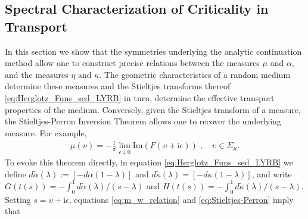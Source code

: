 \documentclass[english,12pt,jmp,graphicx]{revtex4-1}
\newcommand{\I}{\mathrm{i}}
\begin{document}
\subsection{Spectral Characterization of Criticality in
  Transport} \label{sec:Measure_Equivalences}   
%
In this section we show that the symmetries underlying the
analytic continuation method allow one to construct precise relations
between the measures $\mu$ and $\alpha$, and the measures $\eta$ and $\kappa$. The geometric
characteristics of a random medium determine these measures and the
Stieltjes transforms thereof \eqref{eq:Herglotz_Funs_sed_LYRB} in turn,
determine the effective transport properties of the
medium. Conversely, given the Stieltjes transform of a measure, the
Stieltjes-Perron Inversion Theorem
\cite{Day:JPCM-96,Henrici:1974:v3,MILTON:2002:TC} allows one to
recover the underlying measure. For example,  
%
\begin{align}\label{eq:Stieltjes-Perron}
  \mu(\upsilon)=-\frac{1}{\pi}\lim_{\epsilon\downarrow0}\text{Im}(F(\upsilon+\I\epsilon))\;, \quad
  \upsilon\in\Sigma_\mu. 
\end{align}
%
To evoke this theorem directly, in equation
\eqref{eq:Herglotz_Funs_sed_LYRB} we define 
$d\tilde{\alpha}(\lambda):=[-d\alpha(1-\lambda)]$ and $d\tilde{\kappa}(\lambda)=[-d\kappa(1-\lambda)]$, and write
$G(t(s))=-\int_0^1d\tilde{\alpha}(\lambda)/(s-\lambda)$ and
$H(t(s))=-\int_0^1d\tilde{\kappa}(\lambda)/(s-\lambda)$. Setting $s=\upsilon+\I\epsilon$,
equations \eqref{eq:m_w_relation} and \eqref{eq:Stieltjes-Perron}
imply that  
\end{document}
